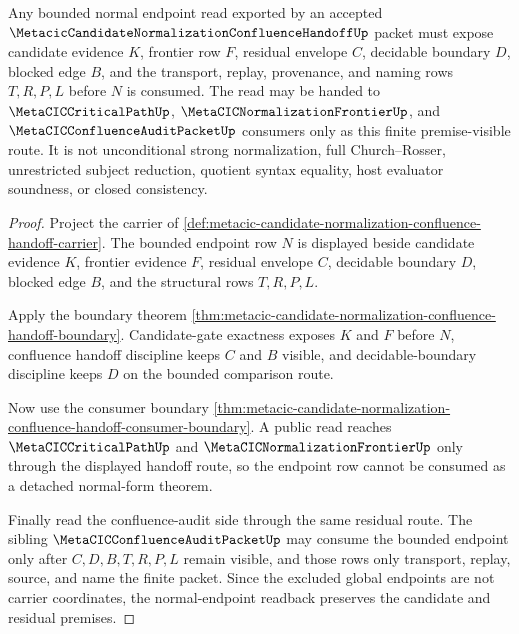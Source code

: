 \begin{theorem}
\label{thm:metacic-candidate-normalization-confluence-handoff-normal-endpoint-readback}
Any bounded normal endpoint read exported by an accepted $\MetacicCandidateNormalizationConfluenceHandoffUp$ packet must expose candidate evidence $K$, frontier row $F$, residual envelope $C$, decidable boundary $D$, blocked edge $B$, and the transport, replay, provenance, and naming rows $T,R,P,L$ before $N$ is consumed. The read may be handed to $\MetaCICCriticalPathUp$, $\MetaCICNormalizationFrontierUp$, and $\MetaCICConfluenceAuditPacketUp$ consumers only as this finite premise-visible route. It is not unconditional strong normalization, full Church--Rosser, unrestricted subject reduction, quotient syntax equality, host evaluator soundness, or closed consistency.
\end{theorem}
\begin{proof}
Project the carrier of \autoref{def:metacic-candidate-normalization-confluence-handoff-carrier}. The bounded endpoint row $N$ is displayed beside candidate evidence $K$, frontier evidence $F$, residual envelope $C$, decidable boundary $D$, blocked edge $B$, and the structural rows $T,R,P,L$.

Apply the boundary theorem \autoref{thm:metacic-candidate-normalization-confluence-handoff-boundary}. Candidate-gate exactness exposes $K$ and $F$ before $N$, confluence handoff discipline keeps $C$ and $B$ visible, and decidable-boundary discipline keeps $D$ on the bounded comparison route.

Now use the consumer boundary \autoref{thm:metacic-candidate-normalization-confluence-handoff-consumer-boundary}. A public read reaches $\MetaCICCriticalPathUp$ and $\MetaCICNormalizationFrontierUp$ only through the displayed handoff route, so the endpoint row cannot be consumed as a detached normal-form theorem.

Finally read the confluence-audit side through the same residual route. The sibling $\MetaCICConfluenceAuditPacketUp$ may consume the bounded endpoint only after $C,D,B,T,R,P,L$ remain visible, and those rows only transport, replay, source, and name the finite packet. Since the excluded global endpoints are not carrier coordinates, the normal-endpoint readback preserves the candidate and residual premises.
\end{proof}

